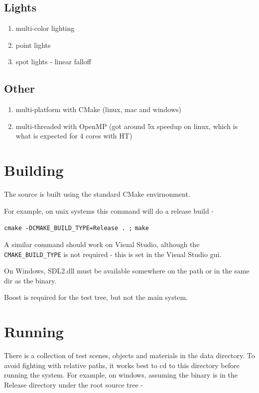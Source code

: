 \subsection{Lights}
    \begin{enumerate}
    \item multi-color lighting
    \item point lights
    \item spot lights - linear falloff
    \end{enumerate}

\subsection{Other}
    \begin{enumerate}
    \item multi-platform with CMake (linux, mac and windows)
    \item multi-threaded with OpenMP (got around 5x speedup on linux, which is what is expected for 4 cores with HT)
    \end{enumerate}

\section{Building}

The source is built using the standard CMake envirnonment.

For example, on unix systems this command will do a release build -

\verb|cmake -DCMAKE_BUILD_TYPE=Release . ;|
\verb|make|

A similar command should work on Visual Studio, although the \verb|CMAKE_BUILD_TYPE| is not required - this is set in the Visual Studio gui.

On Windows, SDL2.dll must be available somewhere on the path or in the same dir as the binary. 

Boost is required for the test tree, but not the main system.

\section{Running}

There is a collection of test scenes, objects and materials in the data directory. To avoid fighting with relative paths, it works best to cd to this directory before running the system. For example, on windows, assuming the binary is in the Release directory under the root source tree - 

